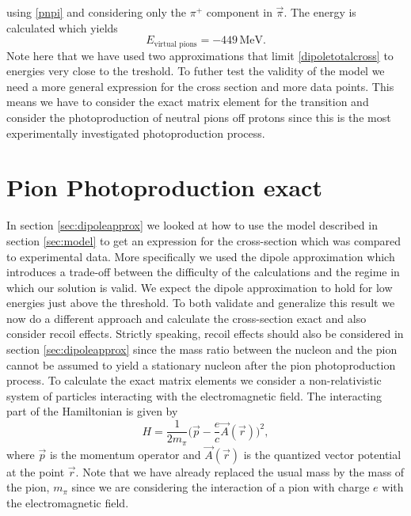 using \eqref{pnpi} and considering only the $\pi^+$ component in $\vec{\pi}$. The energy is calculated which yields
\begin{equation}
    E_{\text{virtual pions}} = -449 \, \text{MeV}.
\end{equation}
Note here that we have used two approximations that limit \eqref{dipoletotalcross} to energies very close to the treshold. To futher test the validity of the model we need a more general expression for the cross section and more data points. This means we have to consider the exact matrix element for the transition and consider the photoproduction of neutral pions off protons since this is the most experimentally investigated photoproduction process. 
\section{Pion Photoproduction exact}
In section \ref{sec:dipoleapprox} we looked at how to use the model described in section \ref{sec:model} to get an expression for the cross-section which was compared to experimental data. More specifically we used the dipole approximation which introduces a trade-off between the difficulty of the calculations and the regime in which our solution is valid. We expect the dipole approximation to hold for low energies just above the threshold. To both validate and generalize this result we now do a different approach and calculate the cross-section exact and also consider recoil effects. Strictly speaking, recoil effects should also be considered in section \ref{sec:dipoleapprox} since the mass ratio between the nucleon and the pion cannot be assumed to yield a stationary nucleon after the pion photoproduction process. To calculate the exact matrix elements we consider a non-relativistic system of particles interacting with the electromagnetic field. The interacting part of the Hamiltonian is given by
\begin{equation} \label{firstinthamil}
	H = \frac{1}{2m_\pi} \bigg( \vec{p}-\frac{e}{c}\vec{A}(\vec{r}) \bigg)^2,
\end{equation}
where $\vec{p}$ is the momentum operator and $\vec{A}(\vec{r})$ is the quantized vector potential at the point $\vec{r}$. Note that we have already replaced the usual mass by the mass of the pion, $m_\pi$ since we are considering the interaction of a pion with charge $e$ with the electromagnetic field. 

